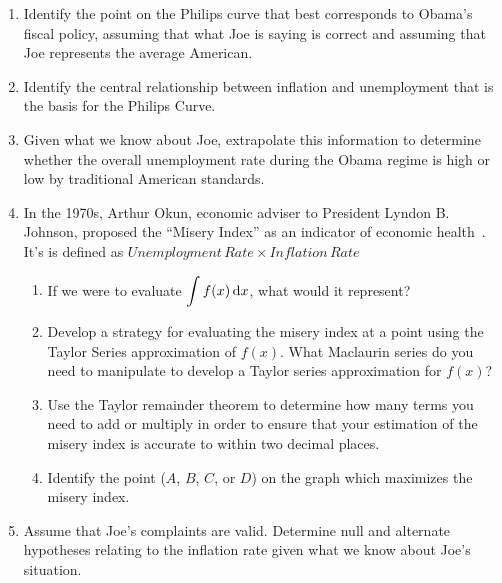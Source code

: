 \begin{enumerate}[itemsep=0.5cm]
\begin{adjustwidth}{0.3in}{0.3in}
\begin{enumerate}[itemsep=0.5cm]
            \item Identify the point on the Philips curve that best
                  corresponds to Obama's fiscal policy, assuming that
                  what Joe is saying is correct and assuming that Joe
                  represents the average American.
            \item Identify the central relationship between inflation
                  and unemployment that is the basis for the Philips Curve.

            \item Given what we know about Joe, extrapolate this
                  information to determine whether the overall unemployment
                  rate during the Obama regime is high or low by traditional
                  American standards.

                  \clearpage

            \item
                  In the 1970s, Arthur Okun, economic adviser to
                  President Lyndon B. Johnson, proposed the ``Misery
                  Index'' as an indicator of economic
                  health~\cite{inflationdata}. It's is defined as
                  $Unemployment\,Rate \times Inflation\,Rate$

                  \begin{enumerate}
                    \item If we were to evaluate $\displaystyle \int f(x) \,
                            \differential x$, what would it represent?

                    \item Develop a strategy for evaluating the misery
                          index at a point using the Taylor Series
                          approximation of $f(x)$. What Maclaurin series do
                          you need to manipulate to develop a Taylor series
                          approximation for $f(x)$?

                    \item Use the Taylor remainder theorem to determine
                          how many terms you need to add or multiply in order
                          to ensure that your estimation of the misery index
                          is accurate to within two decimal places.

                    \item Identify the point ($A$, $B$, $C$, or
                          $D$) on the graph which maximizes the misery
                          index.
                  \end{enumerate}
            \item Assume that Joe's complaints are valid. Determine null
                  and alternate hypotheses relating to the inflation rate
                  given what we know about Joe's situation.


\end{enumerate}
\end{adjustwidth}
\end{enumerate}
